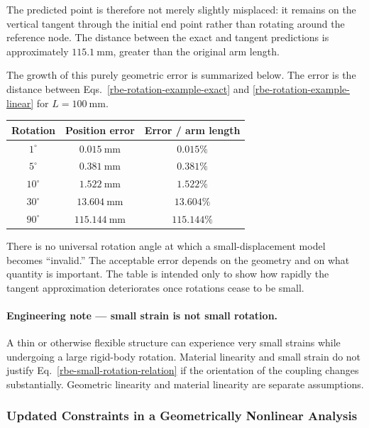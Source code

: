 The predicted point is therefore not merely slightly misplaced: it remains on
the vertical tangent through the initial end point rather than rotating around
the reference node. The distance between the exact and tangent predictions is
approximately $115.1~\mathrm{mm}$, greater than the original arm length.

The growth of this purely geometric error is summarized below. The error is the
distance between Eqs.~\eqref{rbe-rotation-example-exact} and
\eqref{rbe-rotation-example-linear} for $L=100~\mathrm{mm}$.

\begin{center}
\begin{tabular}{|c|c|c|}
\hline
\textbf{Rotation} & \textbf{Position error} & \textbf{Error / arm length} \\
\hline
$1^\circ$  & $0.015~\mathrm{mm}$ & $0.015\%$ \\
$5^\circ$  & $0.381~\mathrm{mm}$ & $0.381\%$ \\
$10^\circ$ & $1.522~\mathrm{mm}$ & $1.522\%$ \\
$30^\circ$ & $13.604~\mathrm{mm}$ & $13.604\%$ \\
$90^\circ$ & $115.144~\mathrm{mm}$ & $115.144\%$ \\
\hline
\end{tabular}
\end{center}

There is no universal rotation angle at which a small-displacement model becomes
``invalid.'' The acceptable error depends on the geometry and on what quantity
is important. The table is intended only to show how rapidly the tangent
approximation deteriorates once rotations cease to be small.

\paragraph{Engineering note --- small strain is not small rotation.}
A thin or otherwise flexible structure can experience very small strains while
undergoing a large rigid-body rotation. Material linearity and small strain do
not justify Eq.~\eqref{rbe-small-rotation-relation} if the orientation of the
coupling changes substantially. Geometric linearity and material linearity are
separate assumptions.

\subsubsection{Updated Constraints in a Geometrically Nonlinear Analysis}

